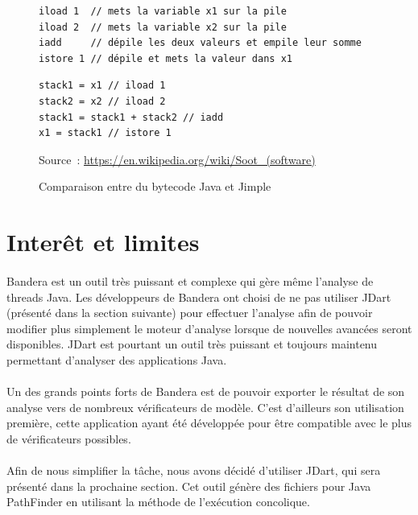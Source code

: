 \begin{figure}[ht]
  \centering
  \begin{framed}
\begin{verbatim}
iload 1  // mets la variable x1 sur la pile
iload 2  // mets la variable x2 sur la pile
iadd     // dépile les deux valeurs et empile leur somme
istore 1 // dépile et mets la valeur dans x1
\end{verbatim}
  \end{framed}

  \begin{framed}
\begin{verbatim}
stack1 = x1 // iload 1
stack2 = x2 // iload 2
stack1 = stack1 + stack2 // iadd
x1 = stack1 // istore 1
\end{verbatim}
  \end{framed}
  \caption{\label{fig:jimple_ex} Comparaison entre du bytecode Java et Jimple}
  Source~: \url{https://en.wikipedia.org/wiki/Soot_(software)}
\end{figure}


\section{Interêt et limites}

\paragraph{}
Bandera est un outil très puissant et complexe qui gère même l'analyse
de threads Java. Les développeurs de Bandera ont choisi de ne pas
utiliser JDart (présenté dans la section suivante) pour effectuer
l'analyse afin de pouvoir modifier plus simplement le moteur d'analyse
lorsque de nouvelles avancées seront disponibles. JDart est pourtant
un outil très puissant et toujours maintenu permettant d'analyser des
applications Java.

\paragraph{}
Un des grands points forts de Bandera est de pouvoir exporter le
résultat de son analyse vers de nombreux vérificateurs de
modèle. C'est d'ailleurs son utilisation première, cette application
ayant été développée pour être compatible avec le plus de
vérificateurs possibles.

\paragraph{}
Afin de nous simplifier la tâche, nous avons décidé d'utiliser JDart,
qui sera présenté dans la prochaine section. Cet outil génère des
fichiers pour Java PathFinder en utilisant la méthode de l'exécution
concolique.

